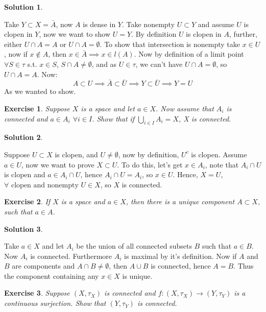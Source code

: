 \documentclass[11pt,a4paper]{article}
\newtheorem{Ex}{Exercise}
\newtheorem{Sol}{Solution}
\begin{document}
\begin{Sol} \end{Sol}
\noindent Take $Y \subset X = \bar{A}$, now $A$ is dense in $Y$. Take nonempty $U \subset Y$ and assume $U$ is clopen in $Y$, now we want to show $U = Y$. By definition $U$ is clopen in $A$, further, either $U \cap A = A$ or $U \cap A = \emptyset$. To show that intersection is nonempty take $x \in U$, now if $x \not\in A$, then $x \in \bar{A} \implies x \in l(A)$. Now by definition of a limit point $\forall S \in \tau$ s.t. $x \in S$, $S \cap A \neq \emptyset$, and as $U \in \tau$, we can't have $U \cap A = \emptyset$, so $U \cap A = A$. Now: $$A \subset U \implies \bar{A} \subset \bar{U} \implies Y \subset \bar{U} \implies Y = U$$ As we wanted to show.

\begin{Ex}
	Suppose $X$ is a space and let $a \in X$. Now assume that $A_i$ is connected and $a \in A_i$ $\forall i \in I$. Show that if $\bigcup_{i \in I}A_i = X$, X is connected. 
\end{Ex}

\begin{Sol} \end{Sol}
\noindent Suppose $U \subset X$ is clopen, and $U \neq \emptyset$, now by definition, $U^c$ is clopen. Assume $a \in U$, now we want to prove $X \subset U$. To do this, let's get $x \in A_i$, note that $A_i \cap U$ is clopen and $a \in A_i \cap U$, hence $A_i \cap U = A_i$, so $x \in U$. Hence, $X = U$, $\forall \text{ clopen and nonempty } U \in X$, so $X$ is connected.

\begin{Ex}
	If $X$ is a space and $a \in X$, then there is a unique component $A \subset X$, such that $a \in A$.
\end{Ex}

\begin{Sol} \end{Sol}
\noindent Take $a \in X$ and let $A_i$ be the union of all connected subsets $B$ such that $a \in B$. Now $A_i$ is connected. Furthermore $A_i$ is maximal by it's definition. Now if $A$ and $B$ are components and $A \cap B \neq \emptyset$, then $A \cup B$ is connected, hence $A = B$. Thus the component containing any $x \in X$ is unique.

\begin{Ex}
	Suppose $(X, \tau_X)$ is connected and $f: (X, \tau_X) \rightarrow (Y, \tau_Y)$ is a continuous surjection. Show that $(Y, \tau_Y)$ is connected.
\end{Ex}
\end{document}
